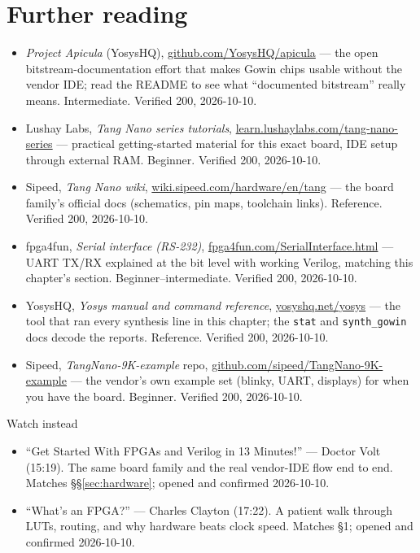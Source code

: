 \section*{Further reading}

\begin{itemize}
\item \emph{Project Apicula} (YosysHQ), \url{github.com/YosysHQ/apicula} --- the
open bitstream-documentation effort that makes Gowin chips usable without the
vendor IDE; read the README to see what ``documented bitstream'' really means.
Intermediate. Verified 200, 2026-10-10.
\item Lushay Labs, \emph{Tang Nano series tutorials},\newline
\url{learn.lushaylabs.com/tang-nano-series} --- practical getting-started
material for this exact board, IDE setup through external RAM. Beginner.
Verified 200, 2026-10-10.
\item Sipeed, \emph{Tang Nano wiki}, \url{wiki.sipeed.com/hardware/en/tang} ---
the board family's official docs (schematics, pin maps, toolchain links).
Reference. Verified 200, 2026-10-10.
\item fpga4fun, \emph{Serial interface (RS-232)},\newline
\url{fpga4fun.com/SerialInterface.html} ---
UART TX/RX explained at the bit level with working Verilog, matching this
chapter's section. Beginner--intermediate. Verified 200, 2026-10-10.
\item YosysHQ, \emph{Yosys manual and command reference}, \url{yosyshq.net/yosys} ---
the tool that ran every synthesis line in this chapter; the \texttt{stat} and
\texttt{synth\_gowin} docs decode the reports. Reference. Verified 200,
2026-10-10.
\item Sipeed, \emph{TangNano-9K-example} repo, \url{github.com/sipeed/TangNano-9K-example} ---
the vendor's own example set (blinky, UART, displays) for when you have the
board. Beginner. Verified 200, 2026-10-10.
\end{itemize}

\begin{rulebox}{Watch instead}
\begin{itemize}
\item ``Get Started With FPGAs and Verilog in 13 Minutes!'' --- Doctor Volt
(15:19). The same board family and the real vendor-IDE flow end to end.
Matches \S\S\ref{sec:hardware}; opened and confirmed 2026-10-10.
\item ``What's an FPGA?'' --- Charles Clayton (17:22). A patient walk through
LUTs, routing, and why hardware beats clock speed. Matches \S1; opened and
confirmed 2026-10-10.
\end{itemize}
\end{rulebox}

